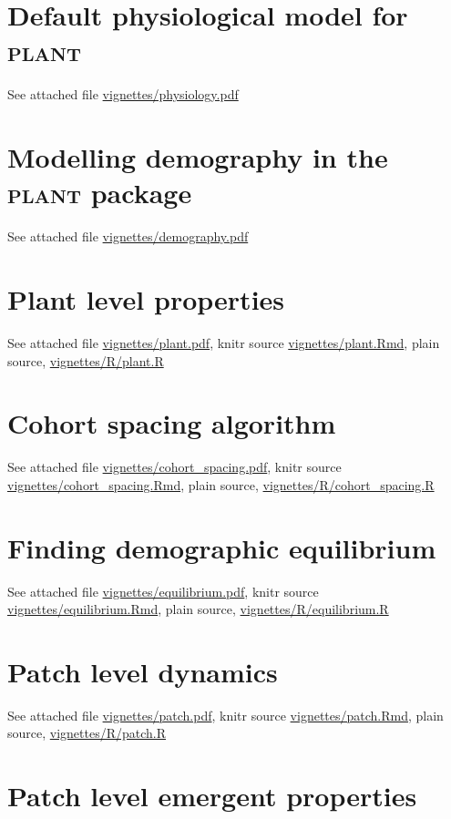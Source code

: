 \documentclass[a4paper,11pt]{article}
\newcommand{\plant}{\textsc{plant}}
\begin{document}
\begin{appendices}\label{sec:appendices}

\section{Default physiological model for {\plant}}\label{sec:FFW16}

See attached file \url{vignettes/physiology.pdf}

\section{Modelling demography in the {\plant} package}\label{sec:demography}

See attached file \url{vignettes/demography.pdf}

\section{Plant level properties}\label{sec:plant}

See attached file \url{vignettes/plant.pdf}, knitr source
\url{vignettes/plant.Rmd}, plain source, \url{vignettes/R/plant.R}

\section{Cohort spacing algorithm}\label{sec:cohort-spacing}

See attached file \url{vignettes/cohort_spacing.pdf}, knitr source
\url{vignettes/cohort_spacing.Rmd}, plain source, \url{vignettes/R/cohort_spacing.R}

\section{Finding demographic equilibrium}\label{sec:equilibrium}

See attached file \url{vignettes/equilibrium.pdf}, knitr source
\url{vignettes/equilibrium.Rmd}, plain source, \url{vignettes/R/equilibrium.R}

\section{Patch level dynamics}\label{sec:patch}

See attached file \url{vignettes/patch.pdf}, knitr source
\url{vignettes/patch.Rmd}, plain source, \url{vignettes/R/patch.R}

\section{Patch level emergent properties}\label{sec:emergent}


\end{appendices}
\end{document}

